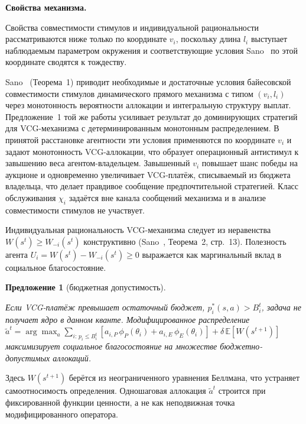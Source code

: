 \documentclass[14pt, oneside]{extbook}
\begin{document}
\textbf{Свойства механизма.}

        Свойства совместимости стимулов и индивидуальной
        рациональности рассматриваются ниже только по координате
        $v_i$, поскольку длина $l_i$ выступает наблюдаемым
        параметром окружения и соответствующие условия
        Sano~\cite{sano} по этой координате сводятся к тождеству.

        Sano~\cite{sano} (Теорема~1) приводит необходимые и
        достаточные условия байесовской совместимости стимулов
        динамического прямого механизма с типом $(v_i, l_i)$
        через монотонность вероятности аллокации и интегральную
        структуру выплат. Предложение~1 той же работы усиливает
        результат до доминирующих стратегий для VCG-механизма
        с детерминированным монотонным распределением. В принятой
        расстановке агентности эти условия применяются по
        координате $v_i$ и задают монотонность VCG-аллокации, что
        образует операционный антистимул к завышению веса
        агентом-владельцем. Завышенный $v_i$ повышает шанс победы
        на аукционе и одновременно увеличивает VCG-платёж,
        списываемый из бюджета владельца, что делает правдивое
        сообщение предпочтительной стратегией. Класс обслуживания
        $\chi_i$ задаётся вне канала сообщений механизма и в
        анализе совместимости стимулов не участвует.

        Индивидуальная рациональность VCG-механизма следует из
        неравенства $W(s^t) \geq W_{-i}(s^t)$ конструктивно
        (Sano~\cite{sano}, Теорема~2, стр.~13). Полезность
        агента $U_i = W(s^t) - W_{-i}(s^t) \geq 0$ выражается
        как маргинальный вклад в социальное благосостояние.

        \textbf{Предложение 1} (бюджетная допустимость).\label{prop:budget}

        \textit{Если VCG-платёж превышает остаточный бюджет,
        $p_i^*(s, a) > B_i^t$, задача не получает ядро
        в данном кванте. Модифицированное распределение
        $\tilde{a}^t = \arg\max_{a}
        \sum_{i:\, p_i \leq B_i^t}
        [a_{i,P}\,\phi_P(\theta_i) + a_{i,E}\,\phi_E(\theta_i)]
        + \delta\,\mathbb{E}[W(s^{t+1})]$
        максимизирует социальное благосостояние на множестве
        бюджетно-допустимых аллокаций.}

        Здесь $W(s^{t+1})$ берётся из неограниченного уравнения
        Беллмана, что устраняет самоотносимость определения.
        Одношаговая аллокация $\tilde a^t$ строится при
        фиксированной функции ценности, а не как неподвижная
        точка модифицированного оператора.
\end{document}
